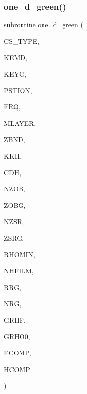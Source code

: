 \subsubsection{\texorpdfstring{one\+\_\+d\+\_\+green()}{one\_d\_green()}}
{\footnotesize\ttfamily subroutine one\+\_\+d\+\_\+green (\begin{DoxyParamCaption}\item[{integer, intent(in)}]{C\+S\+\_\+\+T\+Y\+PE,  }\item[{integer, intent(in)}]{K\+E\+MD,  }\item[{integer, intent(in)}]{K\+E\+YG,  }\item[{real, dimension(8), intent(in)}]{P\+S\+T\+I\+ON,  }\item[{real, intent(in)}]{F\+RQ,  }\item[{integer, intent(in)}]{M\+L\+A\+Y\+ER,  }\item[{real, dimension(0\+:mlayer), intent(in)}]{Z\+B\+ND,  }\item[{complex, dimension(0\+:mlayer), intent(in)}]{K\+KH,  }\item[{complex, dimension(0\+:mlayer), intent(in)}]{C\+DH,  }\item[{integer, intent(in)}]{N\+Z\+OB,  }\item[{real, dimension(nzob), intent(in)}]{Z\+O\+BG,  }\item[{integer, intent(in)}]{N\+Z\+SR,  }\item[{real, dimension(2,nzsr), intent(in)}]{Z\+S\+RG,  }\item[{real, intent(in)}]{R\+H\+O\+M\+IN,  }\item[{integer, intent(in)}]{N\+H\+F\+I\+LM,  }\item[{real, dimension(nrg)}]{R\+RG,  }\item[{integer, intent(in)}]{N\+RG,  }\item[{complex, dimension(11,nhfilm,nzsr,nzob), intent(in)}]{G\+R\+HF,  }\item[{complex, dimension(4,nzsr,nzob), intent(in)}]{G\+R\+H\+O0,  }\item[{complex, dimension(9), intent(out)}]{E\+C\+O\+MP,  }\item[{complex, dimension(9), intent(out)}]{H\+C\+O\+MP }\end{DoxyParamCaption})}

